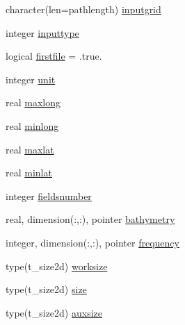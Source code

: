 \begin{DoxyCompactItemize}
\item 
character(len=pathlength) \mbox{\hyperlink{structmoduleconvertmodisl3mapped_1_1t__modisl3mappedformat_ac2fefa5056ece02a23fa1e1bb8ae41bc}{inputgrid}}
\item 
integer \mbox{\hyperlink{structmoduleconvertmodisl3mapped_1_1t__modisl3mappedformat_a264da0cb9cbb4685c7d2f94517b73187}{inputtype}}
\item 
logical \mbox{\hyperlink{structmoduleconvertmodisl3mapped_1_1t__modisl3mappedformat_aaa5354bbc9e97d3a9beed3516504adbc}{firstfile}} = .true.
\item 
integer \mbox{\hyperlink{structmoduleconvertmodisl3mapped_1_1t__modisl3mappedformat_a95bc48b0c8fd62fca90161a59a058e2b}{unit}}
\item 
real \mbox{\hyperlink{structmoduleconvertmodisl3mapped_1_1t__modisl3mappedformat_a3a8d9b24ea70f3e23073ae836914aaa0}{maxlong}}
\item 
real \mbox{\hyperlink{structmoduleconvertmodisl3mapped_1_1t__modisl3mappedformat_ac43f95647986fc580f3792826d836597}{minlong}}
\item 
real \mbox{\hyperlink{structmoduleconvertmodisl3mapped_1_1t__modisl3mappedformat_a909ad2b7f4b79da8c4b27445230bacb2}{maxlat}}
\item 
real \mbox{\hyperlink{structmoduleconvertmodisl3mapped_1_1t__modisl3mappedformat_a4c68898307563246e3c7c2b6f3381bf2}{minlat}}
\item 
integer \mbox{\hyperlink{structmoduleconvertmodisl3mapped_1_1t__modisl3mappedformat_a4e947322761564f1b26f707e9e9c8346}{fieldsnumber}}
\item 
real, dimension(\+:,\+:), pointer \mbox{\hyperlink{structmoduleconvertmodisl3mapped_1_1t__modisl3mappedformat_ae30034b9a900ae281a5b641c031f842e}{bathymetry}}
\item 
integer, dimension(\+:,\+:), pointer \mbox{\hyperlink{structmoduleconvertmodisl3mapped_1_1t__modisl3mappedformat_ac79aeafaa6471a87a0b63c96163c27ef}{frequency}}
\item 
type(t\+\_\+size2d) \mbox{\hyperlink{structmoduleconvertmodisl3mapped_1_1t__modisl3mappedformat_a04227992cb446501e7affcdab6c2f758}{worksize}}
\item 
type(t\+\_\+size2d) \mbox{\hyperlink{structmoduleconvertmodisl3mapped_1_1t__modisl3mappedformat_a13d0b6471ec63f9ed66830a1f8cd9cc1}{size}}
\item 
type(t\+\_\+size2d) \mbox{\hyperlink{structmoduleconvertmodisl3mapped_1_1t__modisl3mappedformat_ae83edf1bb61231cb32330d70b49019b0}{auxsize}}
\item 

\end{DoxyCompactItemize}
